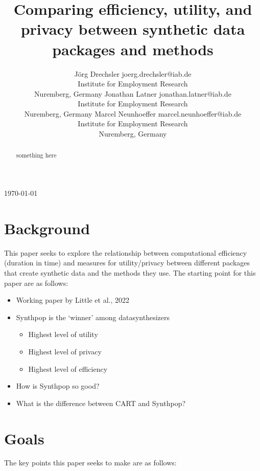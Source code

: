 \documentclass[10pt]{article} %
\title{Comparing efficiency, utility, and privacy between synthetic data packages and methods}
\author{\name Jörg Drechsler \email joerg.drechsler@iab.de \\
      \addr Institute for Employment Research\\
      Nuremberg, Germany
      \AND
      \name Jonathan Latner \email jonathan.latner@iab.de \\
      \addr Institute for Employment Research\\
      Nuremberg, Germany
      \AND
      \name Marcel Neunhoeffer \email marcel.neunhoeffer@iab.de\\
      \addr Institute for Employment Research\\
      Nuremberg, Germany}
\begin{document}
\maketitle
\today
\tableofcontents
\begin{abstract}

something here

\end{abstract}

\section{Background}

This paper seeks to explore the relationship between computational efficiency (duration in time) and measures for utility/privacy between different packages that create synthetic data and the methods they use.  The starting point for this paper are as follows:

\begin{itemize}
    \item Working paper by Little et al., 2022
    \item Synthpop is the `winner' among datasynthesizers
    \begin{itemize}
        \item Highest level of utility
        \item Highest level of privacy
        \item Highest level of efficiency
    \end{itemize}
    \item How is Synthpop so good?
    \item What is the difference between CART and Synthpop?
\end{itemize}

\section{Goals}

The key points this paper seeks to make are as follows:
\end{document}
